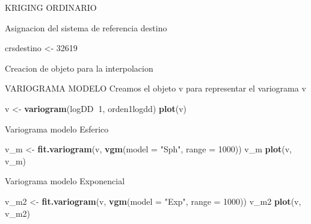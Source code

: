 \documentclass[11pt,]{article}
\newenvironment{Shaded}{\begin{snugshade}}{\end{snugshade}}
\newcommand{\KeywordTok}[1]{\textcolor[rgb]{0.13,0.29,0.53}{\textbf{#1}}}
\newcommand{\DataTypeTok}[1]{\textcolor[rgb]{0.13,0.29,0.53}{#1}}
\newcommand{\DecValTok}[1]{\textcolor[rgb]{0.00,0.00,0.81}{#1}}
\newcommand{\StringTok}[1]{\textcolor[rgb]{0.31,0.60,0.02}{#1}}
\newcommand{\OperatorTok}[1]{\textcolor[rgb]{0.81,0.36,0.00}{\textbf{#1}}}
\newcommand{\NormalTok}[1]{#1}
\begin{document}
KRIGING ORDINARIO

Asignacion del sistema de referencia destino

\begin{Shaded}
\begin{Highlighting}[]
\NormalTok{crsdestino <-}\StringTok{ }\DecValTok{32619}
\end{Highlighting}
\end{Shaded}

Creacion de objeto para la interpolacion

\begin{Shaded}
\end{Shaded}

VARIOGRAMA MODELO Creamos el objeto v para representar el variograma v

\begin{Shaded}
\begin{Highlighting}[]
\NormalTok{v <-}\StringTok{ }\KeywordTok{variogram}\NormalTok{(logDD}\OperatorTok{~}\DecValTok{1}\NormalTok{, orden1logdd)}
\KeywordTok{plot}\NormalTok{(v)}
\end{Highlighting}
\end{Shaded}

Variograma modelo Esferico

\begin{Shaded}
\begin{Highlighting}[]
\NormalTok{v_m <-}\StringTok{ }\KeywordTok{fit.variogram}\NormalTok{(v, }\KeywordTok{vgm}\NormalTok{(}\DataTypeTok{model =} \StringTok{"Sph"}\NormalTok{, }\DataTypeTok{range =} \DecValTok{1000}\NormalTok{))}
\NormalTok{v_m}
\KeywordTok{plot}\NormalTok{(v, v_m)}
\end{Highlighting}
\end{Shaded}

Variograma modelo Exponencial

\begin{Shaded}
\begin{Highlighting}[]
\NormalTok{v_m2 <-}\StringTok{ }\KeywordTok{fit.variogram}\NormalTok{(v, }\KeywordTok{vgm}\NormalTok{(}\DataTypeTok{model =} \StringTok{"Exp"}\NormalTok{, }\DataTypeTok{range =} \DecValTok{1000}\NormalTok{))}
\NormalTok{v_m2}
\KeywordTok{plot}\NormalTok{(v, v_m2)}
\end{Highlighting}
\end{Shaded}
\end{document}
